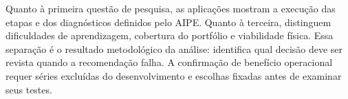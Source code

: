 Quanto à primeira questão de pesquisa, as aplicações mostram a execução das etapas e dos diagnósticos definidos pelo AIPE. Quanto à terceira, distinguem dificuldades de aprendizagem, cobertura do portfólio e viabilidade física. Essa separação é o resultado metodológico da análise: identifica qual decisão deve ser revista quando a recomendação falha. A confirmação de benefício operacional requer séries excluídas do desenvolvimento e escolhas fixadas antes de examinar seus testes.
